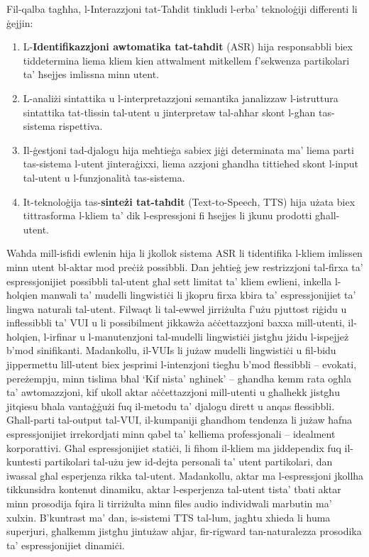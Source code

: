 \documentclass[]{../../metanetpaper}
\begin{document}
\begin{multicols}{2}
Fil-qalba tagħha, l-Interazzjoni tat-Taħdit tinkludi l-erba’ teknoloġiji differenti li ġejjin:

\begin{enumerate}
\item L-\textbf{Identifikazzjoni awtomatika tat-taħdit} (ASR) hija responsabbli biex tiddetermina liema kliem kien attwalment mitkellem f’sekwenza partikolari ta’ ħsejjes imlissna minn utent.
\item L-analiżi sintattika u l-interpretazzjoni semantika janalizzaw l-istruttura sintattika tat-tlissin tal-utent u jinterpretaw tal-aħħar skont l-għan tas-sistema rispettiva.
\item Il-ġestjoni tad-djalogu hija meħtieġa sabiex jiġi determinata ma’ liema parti tas-sistema l-utent jinteraġixxi, liema azzjoni għandha tittieħed skont l-input tal-utent u l-funzjonalità tas-sistema.
\item It-teknoloġija tas-\textbf{sinteżi tat-taħdit} (Text-to-Speech, TTS) hija użata biex tittrasforma l-kliem ta’ dik l-espressjoni fi ħsejjes li jkunu prodotti għall-utent. 
\end{enumerate}

Waħda mill-isfidi ewlenin hija li jkollok sistema ASR li tidentifika  l-kliem imlissen minn utent bl-aktar mod preċiż possibbli. Dan jeħtieġ jew restrizzjoni tal-firxa ta’ espressjonijiet possibbli tal-utent għal sett limitat ta’ kliem ewlieni, inkella l-ħolqien manwali ta’ mudelli lingwistiċi li jkopru firxa kbira ta’ espressjonijiet ta’ lingwa naturali tal-utent. Filwaqt li tal-ewwel jirriżulta f’użu pjuttost riġidu u inflessibbli ta’ VUI u li  possibilment jikkawża aċċettazzjoni baxxa mill-utenti, il-ħolqien, l-irfinar u l-manutenzjoni tal-mudelli lingwistiċi jistgħu jżidu l-ispejjeż b’mod sinifikanti. Madankollu, il-VUIs li jużaw mudelli lingwistiċi u fil-bidu jippermettu lill-utent biex jesprimi l-intenzjoni tiegħu b’mod flessibbli – evokati, pereżempju, minn tislima bħal ‘Kif nista’ ngħinek’ – għandha kemm rata ogħla ta’ awtomazzjoni, kif ukoll aktar aċċettazzjoni mill-utenti u għalhekk jistgħu jitqiesu bħala vantaġġużi fuq il-metodu ta’ djalogu dirett u anqas flessibbli. Għall-parti tal-output tal-VUI, il-kumpaniji għandhom tendenza li jużaw ħafna espressjonijiet irrekordjati minn qabel ta’ kelliema professjonali – idealment korporattivi. Għal espressjonijiet statiċi, li fihom il-kliem ma jiddependix fuq il-kuntesti partikolari tal-użu jew id-dejta personali ta’ utent partikolari, dan iwassal għal esperjenza rikka tal-utent. Madankollu, aktar ma l-espressjoni jkollha tikkunsidra kontenut dinamiku, aktar l-esperjenza tal-utent tista’ tbati aktar minn prosodija fqira li tirriżulta minn files audio individwali marbutin ma’ xulxin. B'kuntrast ma’ dan, is-sistemi TTS tal-lum, jagħtu xhieda li huma superjuri, għalkemm jistgħu jintużaw aħjar, fir-rigward tan-naturalezza prosodika ta’ espressjonijiet dinamiċi.


\end{multicols}
\end{document}

